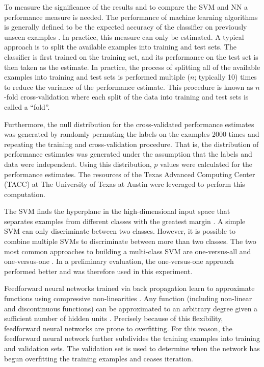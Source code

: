 \documentclass[preprint,5p,authoryear]{elsarticle}
\begin{document}
To measure the significance of the results and to compare the SVM and NN a performance measure is needed.
The performance of machine learning algorithms is generally defined to be the expected accuracy of the classifier on previously unseen examples \citep{Bishop2006}.
In practice, this measure can only be estimated.
A typical approach is to split the available examples into training and test sets.
The classifier is first trained on the training set, and its performance on the test set is then taken as the estimate.
In practice, the process of splitting all of the available examples into training and test sets is performed multiple ($n$; typically 10) times to reduce the variance of the performance estimate.
This procedure is known as $n$-fold cross-validation \citep{Kohavi1995} where each split of the data into training and test sets is called a ``fold''.

Furthermore, the null distribution for the cross-validated performance estimates was generated by randomly permuting the labels on the examples 2000 times and repeating the training and cross-validation procedure.
That is, the distribution of performance estimates was generated under the assumption that the labels and data were independent.
Using this distribution, $p$ values were calculated for the performance estimates.
The resources of the Texas Advanced Computing Center (TACC) at The University of Texas at Austin were leveraged to perform this computation.

The SVM finds the hyperplane in the high-dimensional input space that separates examples from different classes with the greatest margin \citep{Cortes1995}.
A simple SVM can only discriminate between two classes.
However, it is possible to combine multiple SVMs to discriminate between more than two classes.
The two most common approaches to building a multi-class SVM are one-versus-all and one-versus-one \citep{Weston1999}.
In a preliminary evaluation, the one-versus-one approach performed better and was therefore used in this experiment.

Feedforward neural networks trained via back propagation learn to approximate functions using compressive non-linearities \citep{Hagan1994}.
Any function (including non-linear and discontinuous functions) can be approximated to an arbitrary degree given a sufficient number of hidden units \citep{Hornik1989}.
Precisely because of this flexibility, feedforward neural networks are prone to overfitting.
For this reason, the feedforward neural network further subdivides the training examples into training and validation sets.
The validation set is used to determine when the network has begun overfitting the training examples and ceases iteration.
\end{document}
